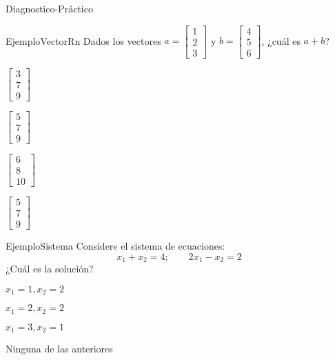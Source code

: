 \documentclass[a4,11pt]{aleph-notas}
\begin{document}
\begin{quiz}{Diagnostico-Práctico}

\begin{multi}[]
    {EjemploVectorRn}
    Dados los vectores \( a = \begin{bmatrix} 1 \\ 2 \\ 3 \end{bmatrix} \) y \( b = \begin{bmatrix} 4 \\ 5 \\ 6 \end{bmatrix} \), ¿cuál es \( a + b \)?
    \item \( \begin{bmatrix} 3 \\ 7 \\ 9 \end{bmatrix} \)
    \item \( \begin{bmatrix} 5 \\ 7 \\ 9 \end{bmatrix} \)
    \item \( \begin{bmatrix} 6 \\ 8 \\ 10 \end{bmatrix} \)
    \item* \( \begin{bmatrix} 5 \\ 7 \\ 9 \end{bmatrix} \)
\end{multi}

\begin{multi}[]
    {EjemploSistema}
    Considere el sistema de ecuaciones:
    \[
    x_1 + x_2 = 4;\qquad
    2x_1 - x_2 = 2
    \]
    ¿Cuál es la solución?
    \item \( x_1 = 1, x_2 = 2 \)
    \item* \( x_1 = 2, x_2 = 2 \)
    \item \( x_1 = 3, x_2 = 1 \)
    \item Ninguna de las anteriores
\end{multi}

\end{quiz}
\end{document}
